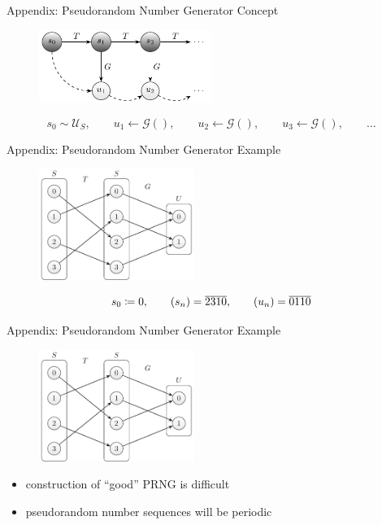 \documentclass[aspectratio=169]{beamer}
\begin{document}
  \appendix

  \begin{frame}{Appendix: Pseudorandom Number Generator Concept}
    \begin{figure}
      \includegraphics[width=0.5\textwidth]{figures/sequence_generation_scheme.pdf}
    \end{figure}
    \vfill
    \begin{mybox}
      \[
        s_0 \sim \mathscr{U}_S,\qquad
        u_1 \leftarrow \mathscr{G}(),\qquad
        u_2 \leftarrow \mathscr{G}(),\qquad
        u_3 \leftarrow \mathscr{G}(),\qquad \ldots
      \]
    \end{mybox}
  \end{frame}

  \begin{frame}{Appendix: Pseudorandom Number Generator Example}
    \begin{figure}
      \includegraphics[width=0.45\textwidth]{figures/prng_example.pdf}
    \end{figure}
    \begin{mybox}
      \[
        s_0 \coloneqq 0, \qquad
        (s_n) = \overline{2310}, \qquad
        (u_n) = \overline{0110}
      \]
    \end{mybox}
  \end{frame}

  \begin{frame}{Appendix: Pseudorandom Number Generator Example}
    \begin{figure}
      \includegraphics[width=0.45\textwidth]{figures/prng_example.pdf}
    \end{figure}
    \begin{itemize}
      \item construction of \enquote{good} PRNG is difficult
      \pause
      \item pseudorandom number sequences will be periodic
    \end{itemize}
  \end{frame}
\end{document}
